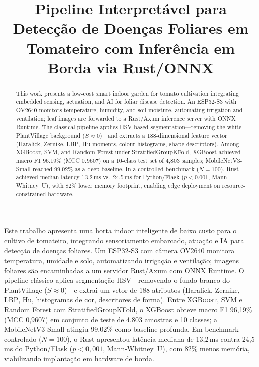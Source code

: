 \documentclass[12pt]{article}
\title{Pipeline Interpretável para Detecção de Doenças Foliares em Tomateiro com Inferência em Borda via Rust/ONNX}
\author{}
\providecommand{\gls}[1]{\textnormal{\textsc{#1}}}
\begin{document}
\maketitle

\begin{abstract}
This work presents a low-cost smart indoor garden for tomato cultivation
integrating embedded sensing, actuation, and AI for foliar disease detection.
An \gls{ESP32}-S3 with \gls{OV2640} monitors temperature, humidity, and soil
moisture, automating irrigation and ventilation; leaf images are forwarded to
a Rust/Axum inference server with ONNX Runtime. The classical pipeline applies
\gls{HSV}-based segmentation---removing the white PlantVillage background
($S\approx0$)---and extracts a 188-dimensional feature vector (Haralick,
Zernike, \gls{LBP}, Hu moments, colour histograms, shape descriptors). Among
\gls{XGBoost}, SVM, and Random Forest under StratifiedGroupKFold, XGBoost
achieved macro F1 96.19\% (MCC 0.9607) on a 10-class test set of 4{,}803
samples; MobileNetV3-Small reached 99.02\% as a deep baseline. In a controlled
benchmark ($N=100$), Rust achieved median latency 13.2\,ms vs.\ 24.5\,ms for
Python/Flask ($p<0.001$, Mann-Whitney~U), with 82\% lower memory footprint,
enabling edge deployment on resource-constrained hardware.
\end{abstract}

\begin{resumo}
Este trabalho apresenta uma horta indoor inteligente de baixo custo para o
cultivo de tomateiro, integrando sensoriamento embarcado, atuação e IA para
detecção de doenças foliares. Um \gls{ESP32}-S3 com câmera \gls{OV2640}
monitora temperatura, umidade e solo, automatizando irrigação e ventilação;
imagens foliares são encaminhadas a um servidor Rust/Axum com ONNX Runtime.
O pipeline clássico aplica segmentação \gls{HSV}---removendo o fundo branco
do PlantVillage ($S\approx0$)---e extrai um vetor de 188 atributos (Haralick,
Zernike, \gls{LBP}, Hu, histogramas de cor, descritores de forma). Entre
\gls{XGBoost}, SVM e Random Forest com StratifiedGroupKFold, o XGBoost obteve
macro F1 96,19\% (MCC 0,9607) em conjunto de teste de 4.803 amostras e 10
classes; a MobileNetV3-Small atingiu 99,02\% como baseline profunda. Em
benchmark controlado ($N=100$), o Rust apresentou latência mediana de
13,2\,ms contra 24,5\,ms do Python/Flask ($p<0{,}001$, Mann-Whitney~U), com
82\% menos memória, viabilizando implantação em hardware de borda.
\end{resumo}
\end{document}
